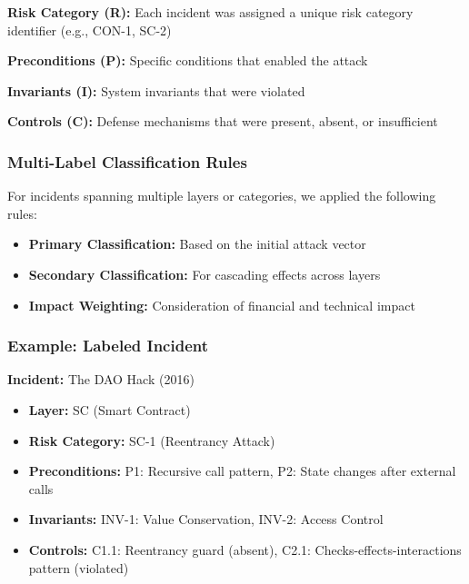 \textbf{Risk Category (R):} Each incident was assigned a unique risk category identifier (e.g., CON-1, SC-2)

\textbf{Preconditions (P):} Specific conditions that enabled the attack

\textbf{Invariants (I):} System invariants that were violated

\textbf{Controls (C):} Defense mechanisms that were present, absent, or insufficient

\subsubsection{Multi-Label Classification Rules}
For incidents spanning multiple layers or categories, we applied the following rules:
\begin{itemize}
    \item \textbf{Primary Classification:} Based on the initial attack vector
    \item \textbf{Secondary Classification:} For cascading effects across layers
    \item \textbf{Impact Weighting:} Consideration of financial and technical impact
\end{itemize}

\subsubsection{Example: Labeled Incident}
\textbf{Incident:} The DAO Hack (2016)
\begin{itemize}
    \item \textbf{Layer:} SC (Smart Contract)
    \item \textbf{Risk Category:} SC-1 (Reentrancy Attack)
    \item \textbf{Preconditions:} P1: Recursive call pattern, P2: State changes after external calls
    \item \textbf{Invariants:} INV-1: Value Conservation, INV-2: Access Control
    \item \textbf{Controls:} C1.1: Reentrancy guard (absent), C2.1: Checks-effects-interactions pattern (violated)
\end{itemize}


